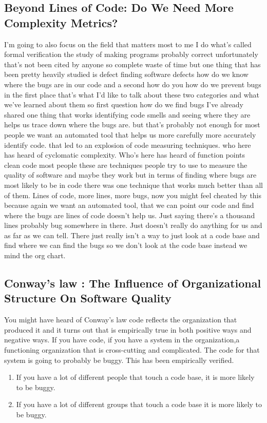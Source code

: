 \documentclass[conference, compsoc, twoside]{IEEEtran}
\begin{document}
\subsection{Beyond Lines of Code: Do We Need More Complexity Metrics?}
I'm going to also focus on the field that matters
most to me I do what's called formal verification the study of making
programs probably correct unfortunately
that's not been cited by anyone so
complete waste of time but one thing
that has been pretty heavily studied is
defect finding software defects how do
we know where the bugs are in our code
and a second how do you how do we
prevent bugs in the first place
that's what I'd like to talk about these two categories and what we've learned
about them so first question how do we
find bugs I've already shared one thing
that works identifying code smells and
seeing where they are helps us trace down where the bugs are. but that's probably not enough for most people we want an automated tool that helps us more carefully more accurately identify code. that led to an explosion of code measuring techniques.
who here has heard of cyclomatic complexity.
Who's here has heard of function points clean code most
people these are techniques people try
to use to measure the quality of
software and maybe they work but in
terms of finding where bugs are most
likely to be in code there was one
technique that works much better than all of them. Lines of code, more lines, more bugs, now you might feel cheated by this because again we want an automated tool, that we can point our code and find where the bugs are lines of code doesn't help us. Just saying there's a thousand lines probably bug somewhere in there.
Just doesn't really do anything for us and as far as we can tell.
There just really isn't a way to just look at a code base and find where we can find the bugs so we don't look at the code base instead we mind the org chart. 
\subsection{Conway's law : The Influence of Organizational Structure On Software Quality}
You might have heard of Conway's law code reflects the organization that produced it and it
turns out that is empirically true in both positive ways and negative ways.
If you have code, if you have a system in the organization,a functioning organization that is cross-cutting and complicated.
The code for that system is going to probably be buggy. 
This has been empirically verified. 
\begin{enumerate}
	\item If you have a lot of different people that touch a code base, it is more likely to be buggy.
	\item If you have a lot of different groups that touch a code base it is more likely to be buggy. 
\end{enumerate}
\end{document}
